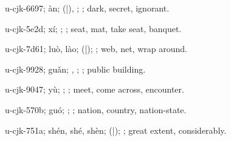 \begin{multicols}{2}
{\cjkgGlue{}u-cjk-6697; àn; \cjkgGlue{}\cjkgGlue{}(\cjkgGlue{}|\cjkgGlue{}), \cjkgGlue{}\cjkgGlue{}\cjkgGlue{}; \cjkgGlue{}; dark, secret, ignorant.

\cjkgGlue{}u-cjk-5e2d; xí; \cjkgGlue{}; \cjkgGlue{}; seat, mat, take seat, banquet.

\cjkgGlue{}u-cjk-7d61; luò, lào; \cjkgGlue{}\cjkgGlue{}(\cjkgGlue{}|\cjkgGlue{}); \cjkgGlue{}; web, net, wrap around.

\cjkgGlue{}u-cjk-9928; guǎn; \cjkgGlue{}, \cjkgGlue{}; \cjkgGlue{}; public building.

\cjkgGlue{}u-cjk-9047; yù; \cjkgGlue{}\cjkgGlue{}\cjkgGlue{}; \cjkgGlue{}; meet, come across, encounter.

\cjkgGlue{}u-cjk-570b; guó; \cjkgGlue{}; \cjkgGlue{}; nation, country, nation-state.

\cjkgGlue{}u-cjk-751a; shén, shé, shèn; \cjkgGlue{}\cjkgGlue{}(\cjkgGlue{}|\cjkgGlue{}); \cjkgGlue{}; great extent, considerably.

}
\end{multicols}
